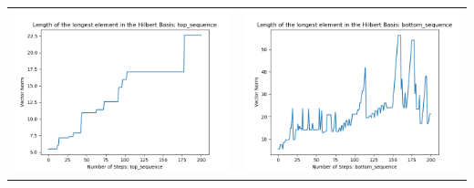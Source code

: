 \documentclass[10pt]{article}
\begin{document}
\begin{tabular}{c|c}
\begin{minipage}{.4\textwidth}
\includegraphics[width=\textwidth]{"DATA/5d/6 generators 2 bound F/top_sequence LENGTH"}
\end{minipage} &
\begin{minipage}{.4\textwidth}
\includegraphics[width=\textwidth]{"DATA/5d/6 generators 2 bound F bottomup/bottom_sequence LENGTH"}
\end{minipage}
\end{tabular}
\end{document}
